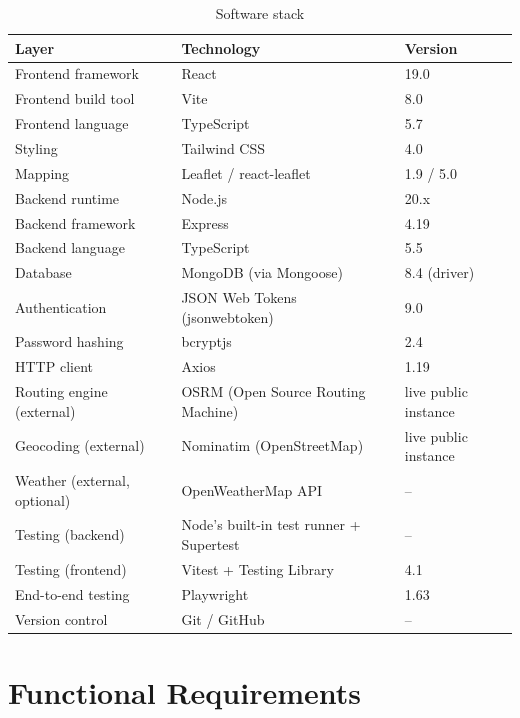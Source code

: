 \documentclass[12pt,a4paper]{report}
\begin{document}
\begin{table}[H]
\centering
\caption{Software stack}
\begin{tabular}{@{}lll@{}}
\toprule
\textbf{Layer} & \textbf{Technology} & \textbf{Version} \\
\midrule
Frontend framework & React & 19.0 \\
Frontend build tool & Vite & 8.0 \\
Frontend language & TypeScript & 5.7 \\
Styling & Tailwind CSS & 4.0 \\
Mapping & Leaflet / react-leaflet & 1.9 / 5.0 \\
Backend runtime & Node.js & 20.x \\
Backend framework & Express & 4.19 \\
Backend language & TypeScript & 5.5 \\
Database & MongoDB (via Mongoose) & 8.4 (driver) \\
Authentication & JSON Web Tokens (jsonwebtoken) & 9.0 \\
Password hashing & bcryptjs & 2.4 \\
HTTP client & Axios & 1.19 \\
Routing engine (external) & OSRM (Open Source Routing Machine) & live public instance \\
Geocoding (external) & Nominatim (OpenStreetMap) & live public instance \\
Weather (external, optional) & OpenWeatherMap API & -- \\
Testing (backend) & Node's built-in test runner + Supertest & -- \\
Testing (frontend) & Vitest + Testing Library & 4.1 \\
End-to-end testing & Playwright & 1.63 \\
Version control & Git / GitHub & -- \\
\bottomrule
\end{tabular}
\end{table}

\section{Functional Requirements}
\end{document}
